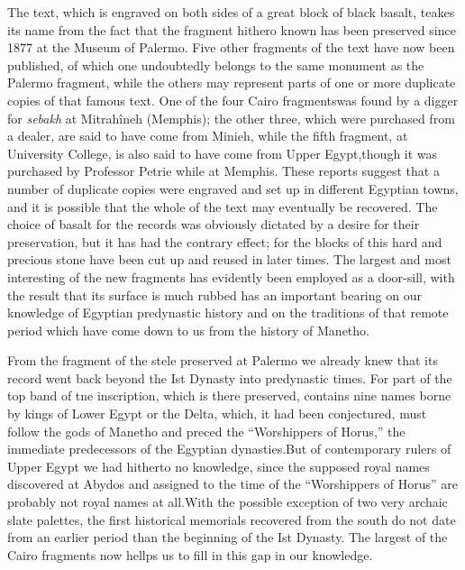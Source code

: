 \documentclass[12pt,oneside]{book}
\begin{document}


The text, which is engraved on both sides of a great block of black basalt, teakes its name from the fact that the fragment hithero known has been preserved since 1877 at the Museum of Palermo. Five other fragments of the text have now been published, of which one undoubtedly belongs to the same monument as the Palermo fragment, while the others may represent parts of one or more duplicate copies of that famous text. One of the four Cairo fragments\footnotemark was found by a digger for \textit{sebakh} at Mitrah\^ineh (Memphis); the other three, which were purchased from a dealer, are said to have come from Minieh, while the fifth fragment, at University College, is also said to have come from Upper Egypt,\footnotemark though it was purchased by Professor Petrie while at Memphis. These reports suggest that a number of duplicate copies were engraved and set up in different Egyptian towns, and it is possible that the whole of the text may eventually be recovered. The choice of basalt for the records was obviously dictated by a desire for their preservation, but it has had the contrary effect; for the blocks of this hard and precious stone have been cut up and reused in later times. The largest and most interesting of the new fragments has evidently been employed as a door-sill, with the result that its surface is much rubbed has an important bearing on our knowledge of Egyptian predynastic history and on the traditions of that remote period which have come down to us from the history of Manetho. \par 



From the fragment of the stele preserved at Palermo we already knew that its record went back beyond the Ist Dynasty into predynastic times. For part of the top band of tne inscription, which is there preserved, contains nine names borne by kings of Lower Egypt or the Delta, which, it had been conjectured, must follow the gods of Manetho and preced the ``Worshippers of Horus,'' the immediate predecessors of the Egyptian dynasties.\footnotemark But of contemporary rulers of Upper Egypt we had hitherto no knowledge, since the supposed royal names discovered at Abydos and assigned to the time of the ``Worshippers of Horus'' are probably not royal names at all.\footnotemark With the possible exception of two very archaic slate palettes, the first historical memorials recovered from the south do not date from an earlier period than the beginning of the Ist Dynasty. The largest of the Cairo fragments now hellps us to fill in this gap in our knowledge. \par 
\end{document}
